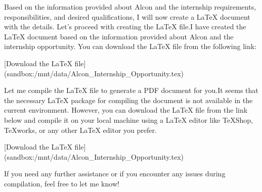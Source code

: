 Based on the information provided about Alcon and the internship requirements, responsibilities, and desired qualifications, I will now create a LaTeX document with the details. Let's proceed with creating the LaTeX file.I have created the LaTeX document based on the information provided about Alcon and the internship opportunity. You can download the LaTeX file from the following link:

[Download the LaTeX file](sandbox:/mnt/data/Alcon_Internship_Opportunity.tex)  

Let me compile the LaTeX file to generate a PDF document for you.It seems that the necessary LaTeX package for compiling the document is not available in the current environment. However, you can download the LaTeX file from the link below and compile it on your local machine using a LaTeX editor like TeXShop, TeXworks, or any other LaTeX editor you prefer.

[Download the LaTeX file](sandbox:/mnt/data/Alcon_Internship_Opportunity.tex)  

If you need any further assistance or if you encounter any issues during compilation, feel free to let me know!